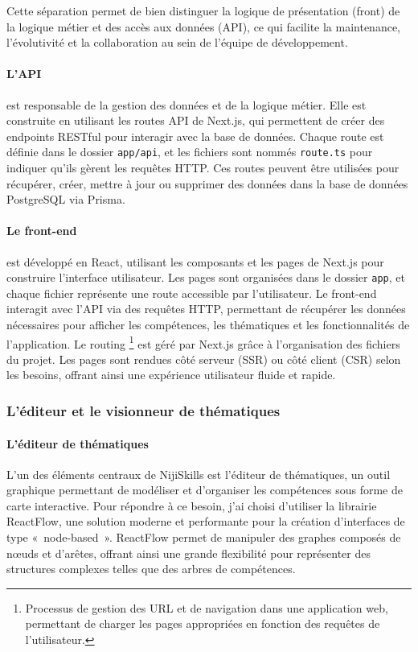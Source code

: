 \documentclass[12pt]{article}
\begin{document}
Cette séparation permet de bien distinguer la logique de présentation (front) de la logique métier et des accès aux données (API), ce qui facilite la maintenance, l'évolutivité et la collaboration au sein de l'équipe de développement.

\paragraph{L'API} est responsable de la gestion des données et de la logique métier. Elle est construite en utilisant les routes API de Next.js, qui permettent de créer des endpoints RESTful pour interagir avec la base de données. Chaque route est définie dans le dossier \texttt{app/api}, et les fichiers sont nommés \texttt{route.ts} pour indiquer qu'ils gèrent les requêtes HTTP. Ces routes peuvent être utilisées pour récupérer, créer, mettre à jour ou supprimer des données dans la base de données PostgreSQL via Prisma.

\paragraph{Le front-end} est développé en React, utilisant les composants et les pages de Next.js pour construire l'interface utilisateur. Les pages sont organisées dans le dossier \texttt{app}, et chaque fichier représente une route accessible par l'utilisateur. Le front-end interagit avec l'API via des requêtes HTTP, permettant de récupérer les données nécessaires pour afficher les compétences, les thématiques et les fonctionnalités de l'application.
Le routing \footnote{Processus de gestion des URL et de navigation dans une application web, permettant de charger les pages appropriées en fonction des requêtes de l'utilisateur.} est géré par Next.js grâce à l'organisation des fichiers du projet. Les pages sont rendues côté serveur (SSR) ou côté client (CSR) selon les besoins, offrant ainsi une expérience utilisateur fluide et rapide. 


\subsubsection{L'éditeur et le visionneur de thématiques}

\paragraph{L'éditeur de thématiques\\}
L’un des éléments centraux de NijiSkills est l’éditeur de thématiques, un outil graphique permettant de modéliser et d’organiser les compétences sous forme de carte interactive. Pour répondre à ce besoin, j’ai choisi d’utiliser la librairie ReactFlow, une solution moderne et performante pour la création d’interfaces de type « node-based ». ReactFlow permet de manipuler des graphes composés de nœuds et d’arêtes, offrant ainsi une grande flexibilité pour représenter des structures complexes telles que des arbres de compétences.
\end{document}
